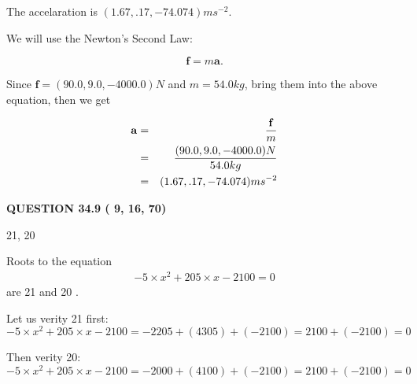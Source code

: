 \documentclass[12pt]{article}
\begin{document}
  
 
 
\noindent{}
 
 
  The accelaration is $  %
(
1.67,
.17,
-74.074)
ms^{-2} $.
 
 
 
 
 
 
\noindent{}

We will use the Newton's Second Law:
 
\[
\mathbf{f}=m\mathbf{a}.
\]
 
Since $\mathbf{f}= %
(90.0 , 9.0 , -4000.0) N$
and $m= %
54.0kg$, bring them into the above equation, then we get
 
\begin{eqnarray*}
\mathbf{a}&=&\frac{\mathbf{f}}m  \\
&=&\frac{ %
(90.0 , 9.0 , -4000.0) N}{ %
54.0kg}  \\
&=& %
(1.67 , .17 , -74.074) ms^{-2}
\end{eqnarray*}
 
 
 
  
\vspace{0.2in}
  
{\textbf{\Large{QUESTION
34.9 
 (          9,         16,         70)
}}}
  
  


 
 
\noindent{}

21,  %
20
 
 
 
 
 
\noindent{}

Roots to the equation
\begin{eqnarray*}
-5 \times x^2  %
+  %
205
                 \times x    %
-2100 =0
\end{eqnarray*}
are  %
21 and  %
20 .
 
Let us verity  %
21 first:
$  %
-5 \times x^2  %
+  %
205
                 \times x    %
-2100
  = %
-2205+( %
4305)+( %
-2100)
  = %
2100+( %
-2100)
  = %
0
$
 
Then verity  %
20:
$  %
-5 \times x^2  %
+  %
205
                 \times x    %
-2100
  = %
-2000+( %
4100)+( %
-2100)
  = %
2100+( %
-2100)
  = %
0
$
 
\end{document}
